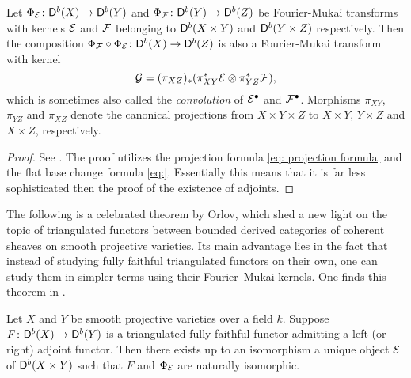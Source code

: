 \begin{proposition}
    \label{Composition of fm is fm}
    Let $\Phi_{\mathcal E} \colon \mathsf{D}^b(X) \to \mathsf{D}^b(Y)$ and $\Phi_{\mathcal F} \colon \mathsf{D}^b(Y) \to \mathsf{D}^b(Z)$ be Fourier-Mukai transforms with kernels $\mathcal E$ and $\mathcal F$ belonging to $\mathsf{D}^b(X \times Y)$ and $\mathsf{D}^b(Y \times Z)$ respectively. Then the composition $\Phi_{\mathcal F} \circ \Phi_{\mathcal E} \colon \mathsf{D}^b(X) \to \mathsf{D}^b(Z)$ is also a Fourier-Mukai transform with kernel
    \[
        \mathcal G = (\pi_{XZ})_*(\pi_{XY}^*\mathcal E \otimes \pi_{YZ}^*\mathcal F),
    \]
    which is sometimes also called the \emph{convolution} of $\mathcal E^\bullet$ and $\mathcal F^\bullet$. Morphisms $\pi_{XY}$, $\pi_{YZ}$ and $\pi_{XZ}$ denote the canonical projections from $X \times Y \times Z$ to $X \times Y$, $Y \times Z$ and $X \times Z$, respectively.
\end{proposition}

\begin{proof}
    See \cite[\S 5, 5.10]{huybrechts2006fouriermukai}. The proof utilizes the projection formula \eqref{eq: projection formula} and the flat base change formula \eqref{eq:}. Essentially this means that it is far less sophisticated then the proof of the existence of adjoints.    
\end{proof}

The following is a celebrated theorem by Orlov, which shed a new light on the topic of triangulated functors between bounded derived categories of coherent sheaves on smooth projective varieties. Its main advantage lies in the fact that instead of studying fully faithful triangulated functors on their own, one can study them in simpler terms using their Fourier--Mukai kernels. One finds this theorem in \cite[Theorem 3.2.2]{Orlov2003}.

\begin{theorem}[Orlov]
    \label{Orlov's theorem}
    Let $X$ and $Y$ be smooth projective varieties over a field $k$. Suppose $F \colon \mathsf{D}^b(X) \to \mathsf{D}^b(Y)$ is a triangulated fully faithful functor admitting a left (or right) adjoint functor. Then there exists up to an isomorphism a unique object $\mathcal E$ of $\mathsf{D}^b(X \times Y)$ such that $F$ and $\Phi_{\mathcal E}$ are naturally isomorphic.
\end{theorem}


